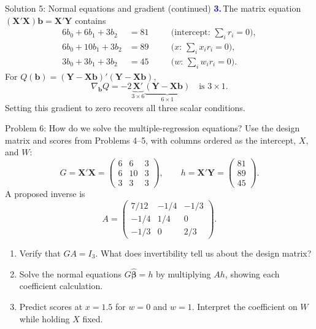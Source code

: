 \documentclass[notes,10pt, aspectratio=169]{beamer}
\newcommand{\answerpart}[1]{\textcolor{blue}{\textbf{#1.}}\,}
\begin{document}
\begin{frame}{Solution 5: Normal equations and gradient (continued)}
\small
\answerpart{3}The matrix equation $(\mathbf X'\mathbf X)\mathbf b=\mathbf X'\mathbf Y$ contains
\[
\begin{aligned}
6b_0+6b_1+3b_2&=81 &&\quad\text{(intercept: }\sum_i r_i=0\text{)},\\
6b_0+10b_1+3b_2&=89 &&\quad\text{($x$: }\sum_i x_ir_i=0\text{)},\\
3b_0+3b_1+3b_2&=45 &&\quad\text{($w$: }\sum_i w_ir_i=0\text{)}.
\end{aligned}
\]
For $Q(\mathbf b)=(\mathbf Y-\mathbf X\mathbf b)'(\mathbf Y-\mathbf X\mathbf b)$,
\[
\nabla_{\mathbf b}Q=-2\underbrace{\mathbf X'}_{3\times6}
\underbrace{(\mathbf Y-\mathbf X\mathbf b)}_{6\times1}
\quad\text{is }3\times1.
\]
Setting this gradient to zero recovers all three scalar conditions.
\end{frame}
\fi

\begin{frame}{Problem 6: How do we solve the multiple-regression equations?}
Use the design matrix and scores from Problems 4--5, with columns ordered as the intercept, $X$, and $W$:
\[
G=\mathbf X'\mathbf X=\begin{pmatrix}6&6&3\\6&10&3\\3&3&3\end{pmatrix},
\qquad
h=\mathbf X'\mathbf Y=\begin{pmatrix}81\\89\\45\end{pmatrix}.
\]
A proposed inverse is
\[
A=\begin{pmatrix}7/12&-1/4&-1/3\\-1/4&1/4&0\\-1/3&0&2/3\end{pmatrix}.
\]
\begin{enumerate}
\setlength{\itemsep}{7pt}
\item Verify that $GA=I_3$. What does invertibility tell us about the design matrix?
\item Solve the normal equations $G\widehat{\boldsymbol\beta}=h$ by multiplying $Ah$, showing each coefficient calculation.
\item Predict scores at $x=1.5$ for $w=0$ and $w=1$. Interpret the coefficient on $W$ while holding $X$ fixed.
\end{enumerate}
\end{frame}
\end{document}
